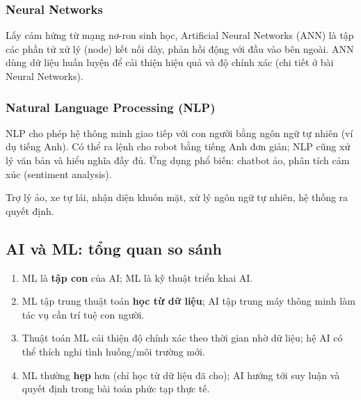 \subsubsection{Neural Networks}

\begin{ynghia}[title={Neural Networks}]
Lấy cảm hứng từ mạng nơ-ron sinh học, Artificial Neural Networks (ANN) là tập các phần tử xử lý (node) kết nối dày, phản hồi động với đầu vào bên ngoài.
ANN dùng dữ liệu huấn luyện để cải thiện hiệu quả và độ chính xác (chi tiết ở bài Neural Networks).
\end{ynghia}

\subsubsection{Natural Language Processing (NLP)}

\begin{ynghia}[title={Natural Language Processing (NLP)}]
NLP cho phép hệ thông minh giao tiếp với con người bằng ngôn ngữ tự nhiên (ví dụ tiếng Anh).
Có thể ra lệnh cho robot bằng tiếng Anh đơn giản; NLP cũng xử lý văn bản và hiểu nghĩa đầy đủ.
Ứng dụng phổ biến: chatbot ảo, phân tích cảm xúc (sentiment analysis).
\end{ynghia}

\begin{vidu}[title={Ví dụ về AI}]
Trợ lý ảo, xe tự lái, nhận diện khuôn mặt, xử lý ngôn ngữ tự nhiên, hệ thống ra quyết định.
\end{vidu}

\subsection{AI và ML: tổng quan so sánh}

\begin{ynghia}[title={Bốn điểm khác biệt chính}]
\begin{enumerate}
  \item ML là \textbf{tập con} của AI; ML là kỹ thuật triển khai AI.
  \item ML tập trung thuật toán \textbf{học từ dữ liệu}; AI tập trung máy thông minh làm tác vụ cần trí tuệ con người.
  \item Thuật toán ML cải thiện độ chính xác theo thời gian nhờ dữ liệu; hệ AI có thể thích nghi tình huống/môi trường mới.
  \item ML thường \textbf{hẹp} hơn (chỉ học từ dữ liệu đã cho); AI hướng tới suy luận và quyết định trong bài toán phức tạp thực tế.
\end{enumerate}
\end{ynghia}

